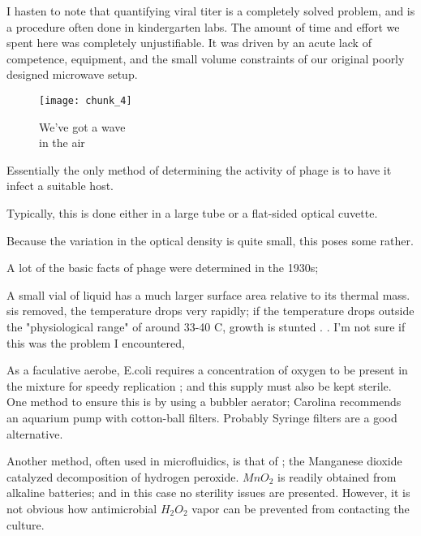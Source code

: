 \documentclass[paper.tex]{subfiles}
\begin{document}
\begin{autem}
	I hasten to note that quantifying viral titer is a completely solved problem, and is a procedure often done in kindergarten labs. The amount of time and effort we spent here was completely unjustifiable. It was driven by an acute lack of competence, equipment, and the small volume constraints of our original poorly designed microwave setup.
\end{autem}


\begin{figure}[H]
	\captionsetup{singlelinecheck = false, justification=justified}
	\centering
	\texttt{[image: chunk\_4]}
	\caption{
		We've got a wave\\
		in the air}
\end{figure}

Essentially the only method of determining the activity of phage is to have it infect a suitable host.

Typically, this is done either in a large tube or a flat-sided optical cuvette.

Because the variation in the optical density is quite small, this poses some rather. 

A lot of the basic facts of phage were determined in the 1930s; 

A small vial of liquid has a much larger surface area relative to its thermal mass. sis removed, the temperature drops very rapidly; if the temperature drops outside the "physiological range" of around 33-40 C, growth is stunted \cite{effect2003}. \cite{growth1946}. I'm not sure if this was the problem I encountered, 

As a faculative aerobe, E.coli requires a concentration of oxygen to be present in the mixture for speedy replication \cite{Effect1965}; and this supply must also be kept sterile. One method to ensure this is by using a bubbler aerator; Carolina recommends an aquarium pump with cotton-ball filters. Probably Syringe filters are a good alternative.

Another method, often used in microfluidics\cite{Microfluidic}, is that of \cite{method1951}; the Manganese dioxide catalyzed decomposition of hydrogen peroxide. $MnO_2$ is readily obtained from alkaline batteries; and in this case no sterility issues are presented. However, it is not obvious how antimicrobial $H_2O_2$ vapor can be prevented from contacting the culture.
\end{document}

